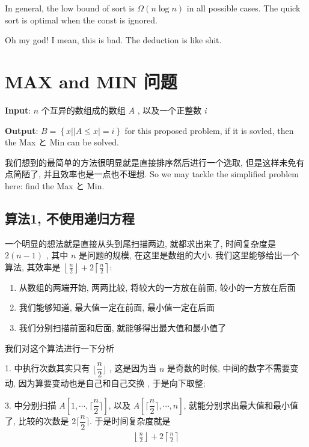 \documentclass[a4paper, 10pt]{ctexart} %
\begin{document}
In general, the low bound of sort is $\Omega \left( n\log n\right)$ in all possible cases.
The quick sort is optimal when the const is ignored.

Oh my god! I mean, this is bad. The deduction is like shit.
\section{MAX and MIN 问题}
\noindent\textbf{Input}: $n$ 个互异的数组成的数组 $A$ , 以及一个正整数 $i$

\noindent\textbf{Output}: $B = \left\{ x | \left| A \le x \right| = i \right\}$
for this proposed problem, if it is sovled, then the Max  と Min can be solved.

我们想到的最简单的方法很明显就是直接排序然后进行一个选取, 但是这样未免有点简陋了, 并且效率也是一点也不理想. So we may tackle the 
simplified problem here: find the Max と Min.

\subsection{算法1, 不使用递归方程}
一个明显的想法就是直接从头到尾扫描两边, 就都求出来了, 时间复杂度是 $2 \left(n-1\right)$ , 其中 $n$ 是问题的规模, 在这里是数组的大小.
我们这里能够给出一个算法, 其效率是 $\displaystyle \left\lfloor \frac{n}{2} \right\rfloor   +  2 \left\lceil \frac{n}{2} \right\rceil$: 

\begin{enumerate}
    \item 从数组的两端开始, 两两比较, 将较大的一方放在前面, 较小的一方放在后面
    \item 我们能够知道, 最大值一定在前面, 最小值一定在后面
    \item 我们分别扫描前面和后面, 就能够得出最大值和最小值了
\end{enumerate}
我们对这个算法进行一下分析

1. 中执行次数其实只有 $\lfloor \dfrac{n}{2} \rfloor$ , 
这是因为当 $n$ 是奇数的时候, 中间的数字不需要变动, 因为算要变动也是自己和自己交换
, 于是向下取整;

3. 中分别扫描 $A \left[ 1, \cdots  ,  \lceil \dfrac{n}{2} \rceil \right]$,
以及 $A \left[ \lceil \dfrac{n}{2} \rceil , \cdots   , n \right]$, 
就能分别求出最大值和最小值了, 
比较的次数是 $2 \lceil \dfrac{n}{2} \rceil$. 于是时间复杂度就是 
\begin{align*}
\displaystyle \left\lfloor \frac{n}{2} \right\rfloor   +  2 \left\lceil \frac{n}{2} \right\rceil
\end{align*}
\end{document}
